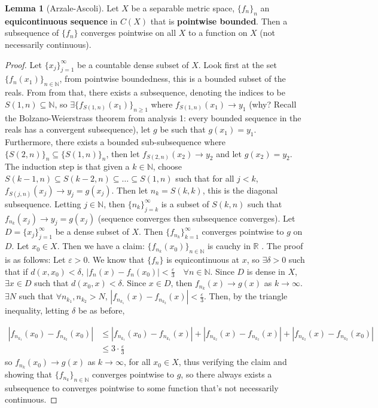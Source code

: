 \documentclass[13pt]{article}
\theoremstyle{definition} --- default
\newtheorem{lemma}[theorem]{Lemma}
\theoremstyle{definition}
\theoremstyle{remark}
\begin{document}
\begin{lemma}[Arzale-Ascoli]
	Let $X$ be a separable metric space, $\{f_n\}_n$ an \textbf{equicontinuous sequence} in $C(X)$ that is \textbf{pointwise bounded}. Then a subsequence of $\{f_n\}$ converges pointwise on all $X$ to a function on $X$ (not necessarily continuous). 
\end{lemma}
\begin{proof}
	Let $\{x_j\}_{j=1}^\infty$ be a countable dense subset of $X$. Look first at the set $\{f_n(x_1)\}_{n \in \mathbb{N}}$, from pointwise boundedness, this is a bounded subset of the reals. From from that, there exists a subsequence, denoting the indices to be $S(1,n) \subseteq \mathbb{N}$, so $\exists \{f_{S(1,n)}(x_1)\}_{n \geq 1}$ where $f_{S(1,n)}(x_1) \to y_1$ (why? Recall the Bolzano-Weierstrass theorem from analysis 1: every bounded sequence in the reals has a convergent subsequence), let $g$ be such that $g(x_1) = y_1$. Furthermore, there exists a bounded sub-subsequence where $\{S(2,n)\}_n \subseteq \{S(1,n)\}_n$, then let $f_{S(2,n)}(x_2) \to y_2$ and let $g(x_2) = y_2$. The induction step is that given a $k \in \mathbb{N}$, choose
	$S(k-1,n) \subseteq S(k-2,n) \subseteq \ldots \subseteq S(1,n)$ such that for all $j < k$, $f_{S(j,n)} (x_j) \to y_j = g(x_j)$. Then let $n_k = S(k,k)$, this is the diagonal subsequence. Letting $j \in \mathbb{N}$, then $\{n_k\}_{j = k}^\infty$ is a subset of $S(k,n)$ such that $f_{n_k} (x_j) \to y_j = g(x_j)$ (sequence converges then subsequence converges). Let $D = \{x_j\}_{j=1}^\infty$ be a dense subset of $X$. Then $\{f_{n_k}\}_{k=1}^\infty$ converges pointwise to $g$ on $D$. Let $x_0 \in X$.  Then we have a claim: $\{f_{n_k}(x_0)\}_{n \in \mathbb{N}}$ is cauchy in $\mathbb{R}$ . The proof is as follows:
	Let $\varepsilon > 0 $. We know that $\{f_{n}\}$ is equicontinuous at $x$, so $\exists \delta > 0$ such that if $d(x,x_0) < \delta$, $|f_{n}(x) - f_n(x_0)| < \frac{\varepsilon}{3} \quad \forall n \in \mathbb{N}$. Since $D$ is dense in $X$, $\exists x \in D$ such that $d(x_0, x) < \delta$. Since $x \in D$, then $f_{n_k}(x) \to g(x)$ as $k \to \infty$. $\exists N$ such that $\forall n_{k_1}, n_{k_2} > N$, $|f_{n_{k_1}}(x) - f_{n_{k_2}}(x)| < \frac{\varepsilon}{3}$. Then, by the triangle inequality, letting $\delta$ be as before, 


	\begin{align*}
		|f_{n_{k_1}}(x_0) - f_{n_{k_2}} (x_0)| &\leq |f_{n_{k_1}}(x_0) - f_{n_{k_1}}(x)| + |f_{n_{k_2}}(x) - f_{n_{k_2}}(x)| + |f_{n_{k_2}}(x) - f_{n_{k_2}}(x_0)| \\
						       &\leq 3 \cdot \frac{\varepsilon}{3} 
	\end{align*}
	so $f_{n_k}(x_0) \to g(x)$ as $k \to \infty$, for all $x_0 \in X$, thus verifying the claim and showing that $\{f_{n_k}\}_{n \in \mathbb{N}}$ converges pointwise to $g$, so there always exists a subsequence to converges pointwise to some function that's not necessarily continuous. 
\end{proof}
\end{document}
